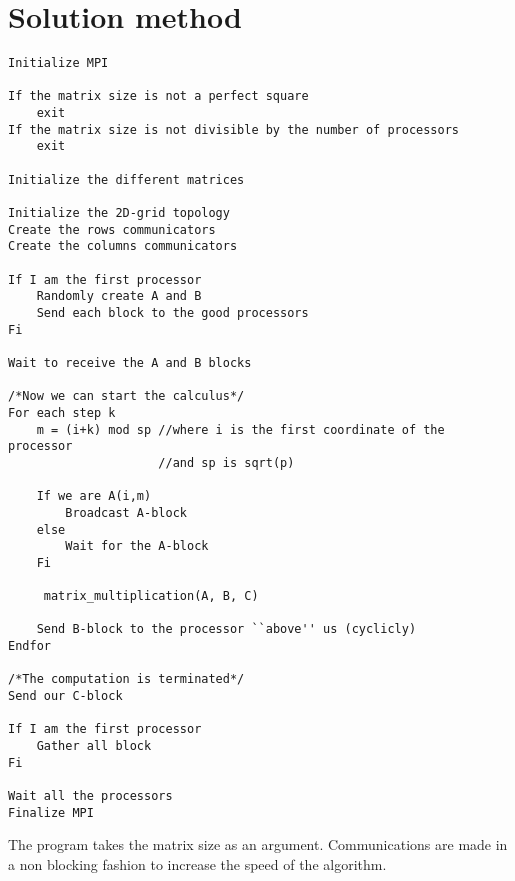 \chapter{Solution method}

\begin{verbatim}
Initialize MPI

If the matrix size is not a perfect square
    exit
If the matrix size is not divisible by the number of processors
    exit 

Initialize the different matrices

Initialize the 2D-grid topology
Create the rows communicators
Create the columns communicators

If I am the first processor
    Randomly create A and B
    Send each block to the good processors
Fi

Wait to receive the A and B blocks

/*Now we can start the calculus*/
For each step k
    m = (i+k) mod sp //where i is the first coordinate of the processor
                     //and sp is sqrt(p)
   
    If we are A(i,m)
        Broadcast A-block
    else
        Wait for the A-block
    Fi

	 matrix_multiplication(A, B, C)

    Send B-block to the processor ``above'' us (cyclicly)
Endfor

/*The computation is terminated*/
Send our C-block

If I am the first processor
    Gather all block
Fi

Wait all the processors
Finalize MPI
\end{verbatim}

The program takes the matrix size as an argument.
Communications are made in a non blocking fashion to increase the speed of the algorithm.
